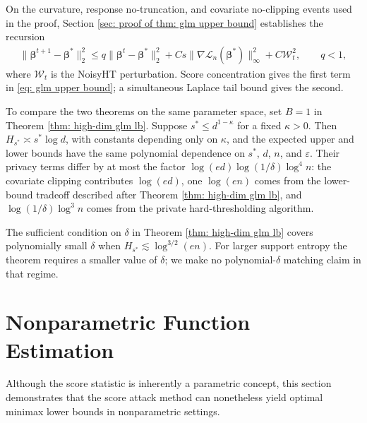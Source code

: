 \documentclass[letterpaper,12pt]{article}
\numberwithin{equation}{section}
\theoremstyle{plain}
\numberwithin{Theorem}{section}
\numberwithin{proposition}{section}
\numberwithin{Lemma}{section}
{
	\theoremstyle{definition}
	\newtheorem{Definition}{Definition}
	\newtheorem{example}{Example}
	\numberwithin{example}{section}
	\newtheorem{fact}{Fact}
	\numberwithin{fact}{section}
	\newtheorem{remark}{Remark}
}
\newcommand{\furtherrev}[1]{#1}
\newcommand{\1}{\mathbbm{1}}
\def\bbeta{{\boldsymbol{\beta}}}
\def\L{{\mathcal L}}
\begin{document}
On the curvature, response no-truncation, and covariate no-clipping events used in the proof, Section \ref{sec: proof of thm: glm upper bound} establishes the recursion
\begin{align*}
	\|\bbeta^{t+1}-\bbeta^*\|_2^2
	\leq q\|\bbeta^t-\bbeta^*\|_2^2
	+C s\|\nabla\L_n(\bbeta^*)\|_\infty^2+C\mathcal W_t^2,
	\qquad q<1,
\end{align*}
where $\mathcal W_t$ is the NoisyHT perturbation.  Score concentration gives the first term in \eqref{eq: glm upper bound}; a simultaneous Laplace tail bound gives the second.

To compare the two theorems on the same parameter space, set $B=1$ in Theorem \ref{thm: high-dim glm lb}.  Suppose $s^*\leq d^{1-\kappa}$ for a fixed $\kappa>0$.  Then $H_{s^*}\asymp s^*\log d$, with constants depending only on $\kappa$, and the expected upper and lower bounds have the same polynomial dependence on $s^*$, $d$, $n$, and $\varepsilon$.  Their privacy terms differ by at most the factor $\log(ed)\log(1/\delta)\log^4n$: the covariate clipping contributes $\log(ed)$, one $\log(en)$ comes from the lower-bound tradeoff described after Theorem \ref{thm: high-dim glm lb}, and $\log(1/\delta)\log^3n$ comes from the private hard-thresholding algorithm.

The sufficient condition on $\delta$ in Theorem \ref{thm: high-dim glm lb} covers polynomially small $\delta$ when $H_{s^*}\lesssim\log^{3/2}(en)$. For larger support entropy the theorem requires a smaller value of $\delta$; we make no polynomial-$\delta$ matching claim in that regime.

\endgroup


\section{\texorpdfstring{\furtherrev{Nonparametric}}{Nonparametric} Function Estimation}\label{sec: nonparametric}
Although the score statistic is inherently a parametric concept, this section demonstrates that the score attack method can nonetheless yield optimal minimax lower bounds in \furtherrev{nonparametric} settings.
\end{document}
